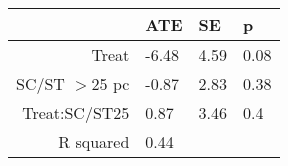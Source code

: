 \begin{tabular}{rlll}
  \hline
 & ATE & SE & p \\ 
  \hline
Treat & -6.48 & 4.59 & 0.08 \\ 
  SC/ST $>$25 pc & -0.87 & 2.83 & 0.38 \\ 
  Treat:SC/ST25 & 0.87 & 3.46 & 0.4 \\ 
  R squared & 0.44 &  &  \\ 
   \hline
\end{tabular}

